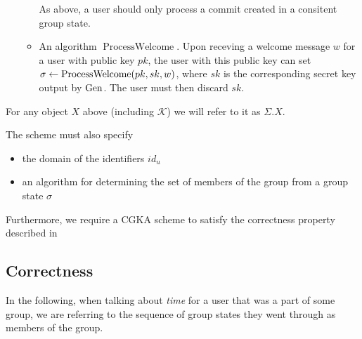 \begin{definition}[CGKA]
\begin{enumerate}[1.]
\begin{itemize}
				      As above, a user should only process a commit created in a consitent group state.
				\item An algorithm $\operatorname{ProcessWelcome}$. Upon receving a welcome message $w$ for a user with public key $pk$, the user with this public key can set $\sigma \leftarrow \operatorname{ProcessWelcome}(pk, sk, w)$, where $sk$ is the corresponding secret key output by $\mathrm{Gen}$. The user must then discard $sk$.
			\end{itemize}
	\end{enumerate}
	For any object $X$ above (including $\mathcal{K}$) we will refer to it as $\Sigma.X$.

	The scheme must also specify
	\begin{itemize}
		\item the domain of the identifiers $id_u$
		\item an algorithm for determining the set of members of the group from a group state $\sigma$
	\end{itemize}

	Furthermore, we require a CGKA scheme to satisfy the correctness property described in 
\end{definition}

\subsection{Correctness}




In the following, when talking about \emph{time} for a user that was a part of some group, we are referring to the sequence of group states they went through as members of the group.

